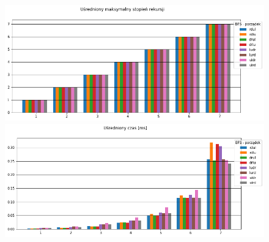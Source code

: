 \documentclass{classrep}
\begin{document}
\begin{figure}[H]
  \includegraphics[scale=0.735]{output_5_3.png}
  \includegraphics[scale=0.735]{output_5_4.png}
\end{figure}
\end{document}
